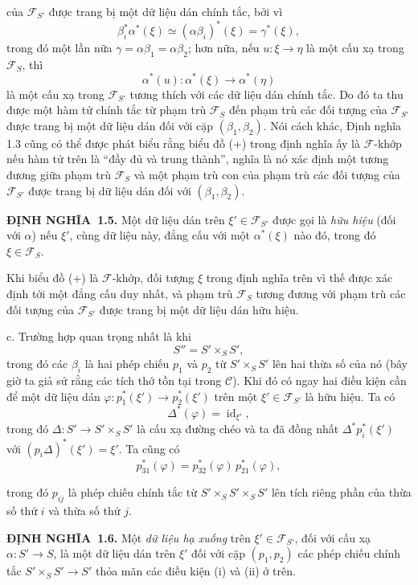 \documentclass[11pt,twoside,openany]{book}
\numberwithin{equation}{section}
\newcommand{\src}[1]{%
  \phantomsection\hypertarget{src:\fgasourceid:#1}{}%
  \marginpar{\raggedleft\footnotesize\sffamily #1}%
}
\newcommand{\fgasourceid}{unset}
\newcommand{\result}[2]{\par\medskip\noindent\textbf{#1\if\relax\detokenize{#2}\relax\else\ #2\fi.}\quad}
\begin{document}
\src{302}
của $\mathcal F_{S'}$ được trang bị một dữ liệu dán chính tắc, bởi vì
\[
  \beta_i^*\alpha^*(\xi)\simeq(\alpha\beta_i)^*(\xi)=\gamma^*(\xi),
\]
trong đó một lần nữa $\gamma=\alpha\beta_1=\alpha\beta_2$; hơn nữa, nếu
$u:\xi\longrightarrow\eta$ là một cấu xạ trong $\mathcal F_S$, thì
\[
  \alpha^*(u):\alpha^*(\xi)\longrightarrow\alpha^*(\eta)
\]
là một cấu xạ trong $\mathcal F_{S'}$ tương thích với các dữ liệu dán chính
tắc. Do đó ta thu được một hàm tử chính tắc từ phạm trù $\mathcal F_S$ đến
phạm trù các đối tượng của $\mathcal F_{S'}$ được trang bị một dữ liệu dán đối
với cặp $(\beta_1,\beta_2)$. Nói cách khác, Định nghĩa 1.3 cũng có thể được
phát biểu rằng biểu đồ (+) trong định nghĩa ấy là $\mathcal F$-khớp nếu hàm tử
trên là ``đầy đủ và trung thành'', nghĩa là nó xác định một tương đương giữa
phạm trù $\mathcal F_S$ và một phạm trù con của phạm trù các đối tượng
của $\mathcal F_{S'}$ được trang bị dữ liệu dán đối với
$(\beta_1,\beta_2)$.

\result{ĐỊNH NGHĨA}{1.5} Một dữ liệu dán trên
$\xi'\in\mathcal F_{S'}$ được gọi là \emph{hữu hiệu} (đối với $\alpha$) nếu
$\xi'$, cùng dữ liệu này, đẳng cấu với một $\alpha^*(\xi)$ nào đó, trong đó
$\xi\in\mathcal F_S$.

Khi biểu đồ (+) là $\mathcal F$-khớp, đối tượng $\xi$ trong định nghĩa trên vì
thế được xác định tới một đẳng cấu duy nhất, và phạm trù
$\mathcal F_S$ tương đương với phạm trù các đối tượng của
$\mathcal F_{S'}$ được trang bị một dữ liệu dán hữu hiệu.

\medskip\noindent
c. Trường hợp quan trọng nhất là khi
\[
  S''=S'\times_S S',
\]
trong đó các $\beta_i$ là hai phép chiếu $p_1$ và $p_2$ từ
$S'\times_S S'$ lên hai thừa số của nó (bây giờ ta giả sử rằng các tích thớ tồn
tại trong $\mathcal C$). Khi đó có ngay hai điều kiện cần để một dữ liệu dán
$\varphi:p_1^*(\xi')\longrightarrow p_2^*(\xi')$ trên một
$\xi'\in\mathcal F_{S'}$ là hữu hiệu. Ta có
\[
  \tag{i}
  \Delta^*(\varphi)=\operatorname{id}_{\xi'},
\]
trong đó $\Delta:S'\longrightarrow S'\times_S S'$ là cấu xạ đường chéo và ta
đã đồng nhất $\Delta^*p_i^*(\xi')$ với
$(p_i\Delta)^*(\xi')=\xi'$. Ta cũng có
\[
  \tag{ii}
  p_{31}^*(\varphi)=p_{32}^*(\varphi)\,p_{21}^*(\varphi),
\]

\src{303}
trong đó $p_{ij}$ là phép chiếu chính tắc từ
$S'\times_S S'\times_S S'$ lên tích riêng phần của thừa số thứ $i$ và thừa số
thứ $j$.

\result{ĐỊNH NGHĨA}{1.6} Một \emph{dữ liệu hạ xuống} trên
$\xi'\in\mathcal F_{S'}$, đối với cấu xạ
$\alpha:S'\longrightarrow S$, là một dữ liệu dán trên $\xi'$ đối với cặp
$(p_1,p_2)$ các phép chiếu chính tắc
$S'\times_S S'\longrightarrow S'$ thỏa mãn các điều kiện (i) và (ii) ở trên.
\end{document}
